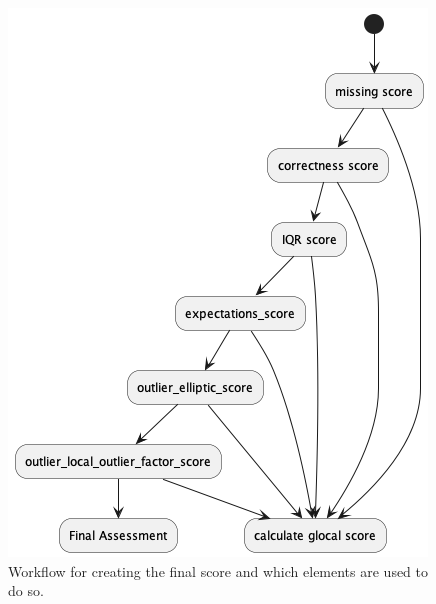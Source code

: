 \begin{figure}[htbp]
    \centering
    \caption{Workflow for creating the final score and which elements are used to do so.}\label{fig:wf} 
    \includegraphics[scale=0.38]{imgs/workflow.png}
    \end{figure}



